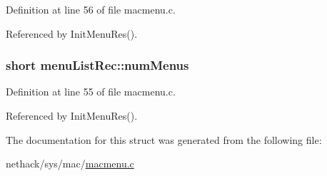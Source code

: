 Definition at line 56 of file macmenu.\+c.



Referenced by Init\+Menu\+Res().

\hypertarget{structmenuListRec_a07dadbc47242d6eb5434900010f256f1}{
\subsubsection[{num\+Menus}]{\setlength{\rightskip}{0pt plus 5cm}short menu\+List\+Rec\+::num\+Menus}}\label{structmenuListRec_a07dadbc47242d6eb5434900010f256f1}


Definition at line 55 of file macmenu.\+c.



Referenced by Init\+Menu\+Res().



The documentation for this struct was generated from the following file\+:\begin{DoxyCompactItemize}
\item 
nethack/sys/mac/\hyperlink{macmenu_8c}{macmenu.\+c}\end{DoxyCompactItemize}
